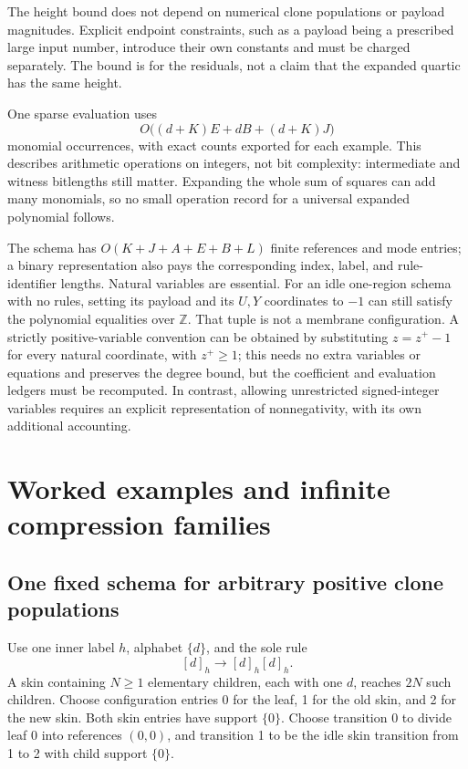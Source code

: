 \documentclass[11pt,letterpaper]{article}
\theoremstyle{definition}
\theoremstyle{remark}
\newcommand{\Z}{\mathbb Z}
\begin{document}
The height bound does not depend on numerical clone populations or payload magnitudes. Explicit endpoint constraints, such as a payload being a prescribed large input number, introduce their own constants and must be charged separately. The bound is for the residuals, not a claim that the expanded quartic has the same height.

One sparse evaluation uses
\[
 O\bigl((d+K)E+dB+(d+K)J\bigr)
\]
monomial occurrences, with exact counts exported for each example. This describes arithmetic operations on integers, not bit complexity: intermediate and witness bitlengths still matter. Expanding the whole sum of squares can add many monomials, so no small operation record for a universal expanded polynomial follows.

The schema has $O(K+J+A+E+B+L)$ finite references and mode entries; a binary representation also pays the corresponding index, label, and rule-identifier lengths. Natural variables are essential. For an idle one-region schema with no rules, setting its payload and its $U,Y$ coordinates to $-1$ can still satisfy the polynomial equalities over $\Z$. That tuple is not a membrane configuration. A strictly positive-variable convention can be obtained by substituting $z=z^+-1$ for every natural coordinate, with $z^+\geq1$; this needs no extra variables or equations and preserves the degree bound, but the coefficient and evaluation ledgers must be recomputed. In contrast, allowing unrestricted signed-integer variables requires an explicit representation of nonnegativity, with its own additional accounting.

\section{Worked examples and infinite compression families}\label{qoc:mm:sec:examples}
\subsection{One fixed schema for arbitrary positive clone populations}\label{qoc:mm:sec:constant}
Use one inner label $h$, alphabet $\{d\}$, and the sole rule
\[
 [d]_h\longrightarrow[d]_h[d]_h.
\]
A skin containing $N\geq1$ elementary children, each with one $d$, reaches $2N$ such children. Choose configuration entries 0 for the leaf, 1 for the old skin, and 2 for the new skin. Both skin entries have support $\{0\}$. Choose transition 0 to divide leaf 0 into references $(0,0)$, and transition 1 to be the idle skin transition from 1 to 2 with child support $\{0\}$.
\end{document}
